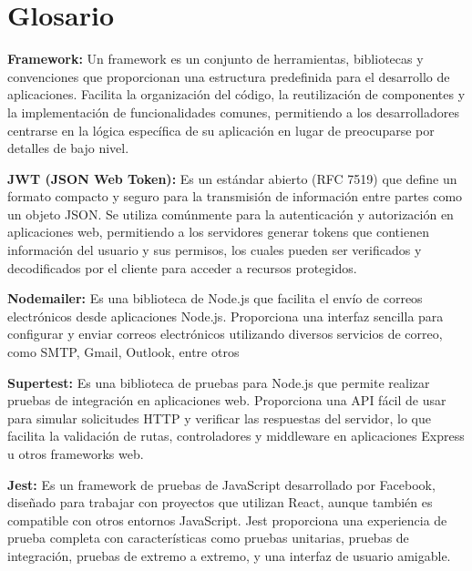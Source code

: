 \chapter*{Glosario}

\begin{description}
  \item \textbf{Framework:} Un framework es un conjunto de herramientas, bibliotecas y convenciones que proporcionan una estructura predefinida para el desarrollo de aplicaciones. Facilita la organización del código, la reutilización de componentes y la implementación de funcionalidades comunes, permitiendo a los desarrolladores centrarse en la lógica específica de su aplicación en lugar de preocuparse por detalles de bajo nivel.

  \item \textbf{JWT (JSON Web Token):} Es un estándar abierto (RFC 7519) que define un formato compacto y seguro para la transmisión de información entre partes como un objeto JSON. Se utiliza comúnmente para la autenticación y autorización en aplicaciones web, permitiendo a los servidores generar tokens que contienen información del usuario y sus permisos, los cuales pueden ser verificados y decodificados por el cliente para acceder a recursos protegidos.

  \item \textbf{Nodemailer:} Es una biblioteca de Node.js que facilita el envío de correos electrónicos desde aplicaciones Node.js. Proporciona una interfaz sencilla para configurar y enviar correos electrónicos utilizando diversos servicios de correo, como SMTP, Gmail, Outlook, entre otros

  \item \textbf{Supertest:} Es una biblioteca de pruebas para Node.js que permite realizar pruebas de integración en aplicaciones web. Proporciona una API fácil de usar para simular solicitudes HTTP y verificar las respuestas del servidor, lo que facilita la validación de rutas, controladores y middleware en aplicaciones Express u otros frameworks web.

  \item \textbf{Jest:} Es un framework de pruebas de JavaScript desarrollado por Facebook, diseñado para trabajar con proyectos que utilizan React, aunque también es compatible con otros entornos JavaScript. Jest proporciona una experiencia de prueba completa con características como pruebas unitarias, pruebas de integración, pruebas de extremo a extremo, y una interfaz de usuario amigable.


\end{description}
